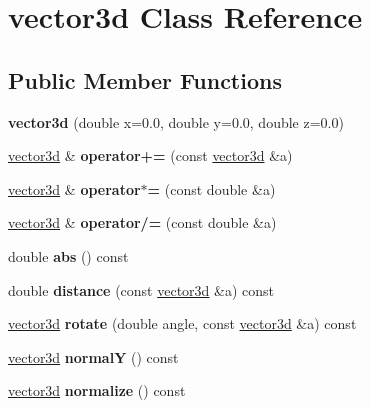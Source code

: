 \hypertarget{classvector3d}{
\section{vector3d Class Reference}
\label{classvector3d}
}
\subsection*{Public Member Functions}
\begin{DoxyCompactItemize}
\item 
\hypertarget{classvector3d_a548796c7f2616b8bf8de26343fb379b6}{
{\bfseries vector3d} (double x=0.0, double y=0.0, double z=0.0)}
\label{classvector3d_a548796c7f2616b8bf8de26343fb379b6}

\item 
\hypertarget{classvector3d_a5d58970c35cee80e6d48895fcae016a5}{
\hyperlink{classvector3d}{vector3d} \& {\bfseries operator+=} (const \hyperlink{classvector3d}{vector3d} \&a)}
\label{classvector3d_a5d58970c35cee80e6d48895fcae016a5}

\item 
\hypertarget{classvector3d_a322c24cf571b461e2aceb52face3a2b7}{
\hyperlink{classvector3d}{vector3d} \& {\bfseries operator$\ast$=} (const double \&a)}
\label{classvector3d_a322c24cf571b461e2aceb52face3a2b7}

\item 
\hypertarget{classvector3d_a58467b5a5ca9bca3c89093e696fc6ef5}{
\hyperlink{classvector3d}{vector3d} \& {\bfseries operator/=} (const double \&a)}
\label{classvector3d_a58467b5a5ca9bca3c89093e696fc6ef5}

\item 
\hypertarget{classvector3d_a94625cb044aab97f8c447ffc4f71c835}{
double {\bfseries abs} () const }
\label{classvector3d_a94625cb044aab97f8c447ffc4f71c835}

\item 
\hypertarget{classvector3d_abc642bce98de58271602d9232ca26ab0}{
double {\bfseries distance} (const \hyperlink{classvector3d}{vector3d} \&a) const }
\label{classvector3d_abc642bce98de58271602d9232ca26ab0}

\item 
\hypertarget{classvector3d_a4267139554c2373293a4370f8dc96902}{
\hyperlink{classvector3d}{vector3d} {\bfseries rotate} (double angle, const \hyperlink{classvector3d}{vector3d} \&a) const }
\label{classvector3d_a4267139554c2373293a4370f8dc96902}

\item 
\hypertarget{classvector3d_adf0f76f6863772a7856190ff054c34e9}{
\hyperlink{classvector3d}{vector3d} {\bfseries normalY} () const }
\label{classvector3d_adf0f76f6863772a7856190ff054c34e9}

\item 
\hypertarget{classvector3d_a358e7e5faad5a1d43ce3a4fdb22c262d}{
\hyperlink{classvector3d}{vector3d} {\bfseries normalize} () const }
\label{classvector3d_a358e7e5faad5a1d43ce3a4fdb22c262d}

\end{DoxyCompactItemize}

